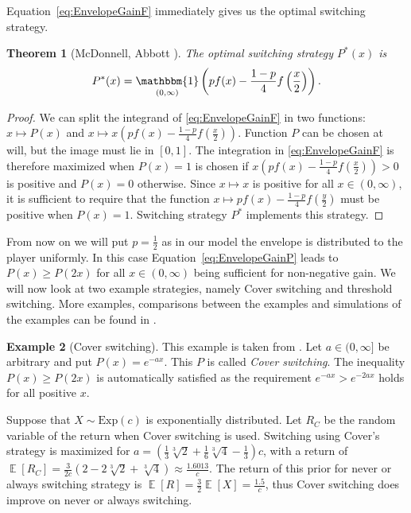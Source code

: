 \documentclass[a4paper]{report}
\theoremstyle{plain}
\newtheorem{theorem}{Theorem}[section]
\theoremstyle{definition}
\newtheorem{example}[theorem]{Example}
\theoremstyle{remark}
\numberwithin{equation}{chapter}
\DeclareMathOperator{\E}{\mathbb{E}}
\DeclareMathOperator{\1}{\mathbbm{1}}
\begin{document}
Equation~\ref{eq:EnvelopeGainF} immediately gives us the optimal switching strategy.
\begin{theorem}[McDonnell, Abbott \cite{McDonnell09}]\label{thm:switchopt}
The optimal switching strategy $P^*(x)$ is
\begin{equation}
P^*(x)=\1_{(0,\infty)}\left(pf(x)-\frac{1-p}{4}f\left(\frac{x}{2}\right)\right).\end{equation}
\end{theorem}
\begin{proof}
We can split the integrand of \eqref{eq:EnvelopeGainF} in two functions: $x\mapsto P(x)$ and $x\mapsto x\left(pf(x)-\frac{1-p}{4}f\left(\frac{x}{2}\right)\right)$. Function $P$ can be chosen at will, but the image must lie in $[0,1]$. The integration in \eqref{eq:EnvelopeGainF} is therefore maximized when $P(x)=1$ is chosen if $x\left(pf(x)-\frac{1-p}{4}f\left(\frac{x}{2}\right)\right)>0$ is positive and $P(x)=0$ otherwise. Since $x\mapsto x$ is positive for all $x\in(0,\infty)$, it is sufficient to require that the function $x\mapsto pf(x)-\frac{1-p}{4}f\left(\frac{y}{2}\right)$ must be positive when $P(x)=1$. Switching strategy $P^*$ implements this strategy.
\end{proof}

From now on we will put $p=\frac{1}{2}$ as in our model the envelope is  distributed to the player uniformly. In this case Equation~\ref{eq:EnvelopeGainP} leads to $P(x)\geq P(2x)$ for all $x\in(0,\infty)$ being sufficient for non-negative gain. We will now look at two example strategies, namely Cover switching and threshold switching. More examples, comparisons between the examples and simulations of the examples can be found in \cite{McDonnell09,Abbott10,McDonnell11}.

\begin{example}[Cover switching]
This example is taken from \cite{McDonnell09,Abbott10}. Let $a\in(0,\infty]$ be arbitrary and put $P(x)=e^{-ax}$. This $P$ is called \emph{Cover switching}. The inequality $P(x)\geq P(2x)$ is automatically satisfied as the requirement $e^{-ax}>e^{-2ax}$ holds for all positive $x$.

Suppose that $X\sim\mathrm{Exp}(c)$ is exponentially distributed. Let $R_C$ be the random variable of the return when Cover switching is used. Switching using Cover's strategy is maximized for $a=\left(\frac{1}{3}\sqrt[3]{2}+\frac{1}{6}\sqrt[3]{4}-\frac{1}{3}\right)c$, with a return of $\E[R_C]=\frac{3}{2c}\left(2-2\sqrt[3]{2}+\sqrt[3]{4}\right)\approx\frac{1.6013}{c}$. The return of this prior for never or always switching strategy is $\E[R]=\frac{3}{2}\E[X]=\frac{1.5}{c}$, thus Cover switching does improve on never or always switching.
\end{example}
\end{document}
